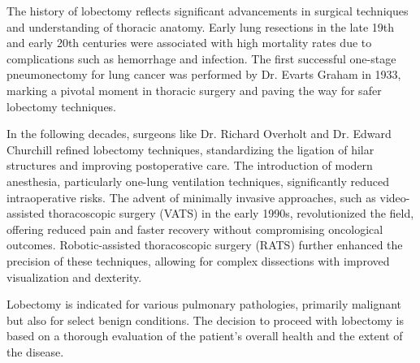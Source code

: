 The history of lobectomy reflects significant advancements in surgical techniques and understanding of thoracic anatomy. Early lung resections in the late 19th and early 20th centuries were associated with high mortality rates due to complications such as hemorrhage and infection. The first successful one-stage pneumonectomy for lung cancer was performed by Dr. Evarts Graham in 1933, marking a pivotal moment in thoracic surgery and paving the way for safer lobectomy techniques.

In the following decades, surgeons like Dr. Richard Overholt and Dr. Edward Churchill refined lobectomy techniques, standardizing the ligation of hilar structures and improving postoperative care. The introduction of modern anesthesia, particularly one-lung ventilation techniques, significantly reduced intraoperative risks. The advent of minimally invasive approaches, such as video-assisted thoracoscopic surgery (VATS) in the early 1990s, revolutionized the field, offering reduced pain and faster recovery without compromising oncological outcomes. Robotic-assisted thoracoscopic surgery (RATS) further enhanced the precision of these techniques, allowing for complex dissections with improved visualization and dexterity.

Lobectomy is indicated for various pulmonary pathologies, primarily malignant but also for select benign conditions. The decision to proceed with lobectomy is based on a thorough evaluation of the patient's overall health and the extent of the disease.

